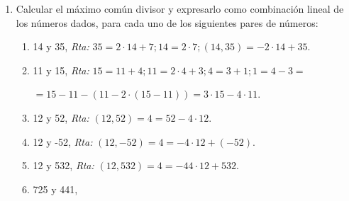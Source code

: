 \documentclass[a4paper,12pt,twoside,spanish,reqno]{amsbook}
\numberwithin{equation}{section}
\newcommand{\rta}{\noindent\textit{Rta: }}
\begin{document}
\begin{enumerate}
\begin{enumerate}
      \item $(-1109,-4999)$.
      
      \rta Es lo mismo calcular  $(1109,3997)$
      \begin{align*}
        3997 &= 1109 \cdot 3  + 670 \\
        1109 &= 670 \cdot 1  + 439 \\
        670 &= 439 \cdot 1  + 231 \\
        439 &= 231 \cdot 1  + 208 \\
        208 &= 23 \cdot 9  + 1 \\
        23 &= 1 \cdot 23  + 0 \\
    \end{align*}
    Por lo tanto, $(-1109,-4999)=1$.
      

  \end{enumerate}






\item
Calcular el máximo común divisor y expresarlo como combinaci\'on lineal de los
números dados, para cada uno de  los siguientes pares de números:
\begin{enumerate}
    \item     14 y 35, \rta $35=2\cdot14+7; 14=2\cdot7; (14, 35)=-2\cdot 14+35$.
    \item 11 y 15, \rta  $15=11+4; 11=2\cdot4+3; 4=3+1; 1= 4-3=$\par\quad\quad\quad\quad\quad$=15-11- (11-2\cdot(15-11))=3\cdot 15-4\cdot11$.
    \item 12 y 52, \rta  $(12, 52)=4=52-4\cdot12$.
    \item  12 y -52, \rta  $(12, -52)=4=-4\cdot 12+(-52)$.
    \item 12 y 532,  \rta  $ (12,532)=4=-44\cdot 12+532$.
    \item  725 y 441,
    

\end{enumerate}
\end{enumerate}
\end{document}

